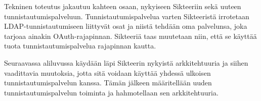 Tekninen toteutus jakautuu kahteen osaan, nykyiseen Sikteeriin sekä uuteen tunnistautumispalveluun. Tunnistautumispalvelua varten Sikteeristä irrotetaan LDAP-tunnistautumiseen liittyvät osat ja niistä tehdään oma palvelunsa, joka tarjoaa ainakin OAuth-rajapinnan. Sikteeriä taas muutetaan niin, että se käyttää tuota tunnistautumispalvelua rajapinnan kautta.

Seuraavassa aliluvussa käydään läpi Sikteerin nykyistä arkkitehtuuria ja siihen vaadittavia muutoksia, jotta sitä voidaan käyttää yhdessä ulkoisen tunnistautumispalvelun kanssa. Tämän jälkeen määritellään uuden tunnistautumispalvelun toiminta ja hahmotellaan sen arkkitehtuuria.